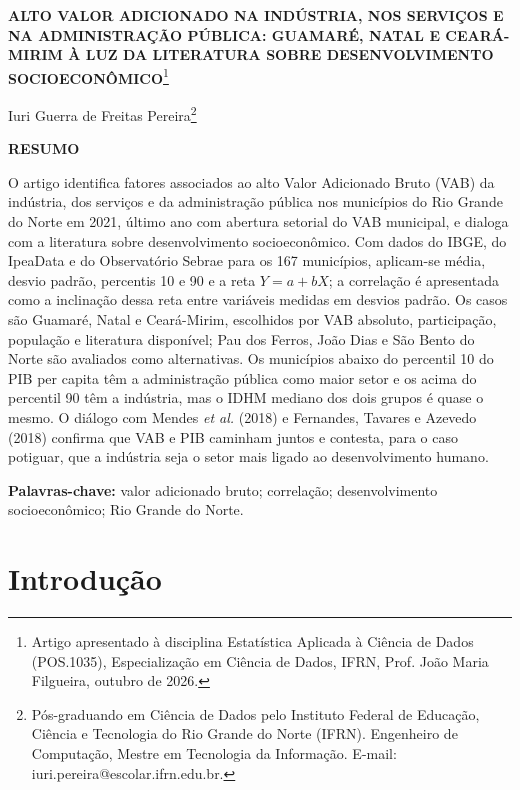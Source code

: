 \documentclass[12pt,a4paper]{article}
\begin{document}
\thispagestyle{empty}
\begin{singlespace}
\begin{center}
\textbf{ALTO VALOR ADICIONADO NA INDÚSTRIA, NOS SERVIÇOS E NA ADMINISTRAÇÃO PÚBLICA: GUAMARÉ, NATAL E CEARÁ-MIRIM À LUZ DA LITERATURA SOBRE DESENVOLVIMENTO SOCIOECONÔMICO}\footnote{Artigo apresentado à disciplina Estatística Aplicada à Ciência de Dados (POS.1035), Especialização em Ciência de Dados, IFRN, Prof. João Maria Filgueira, outubro de 2026.}
\end{center}
\vspace{8pt}
\begin{flushright}
Iuri Guerra de Freitas Pereira\footnote{Pós-graduando em Ciência de Dados pelo Instituto Federal de Educação, Ciência e Tecnologia do Rio Grande do Norte (IFRN). Engenheiro de Computação, Mestre em Tecnologia da Informação. E-mail: iuri.pereira@escolar.ifrn.edu.br.}
\end{flushright}
\vspace{8pt}
\noindent\textbf{RESUMO}

\noindent O artigo identifica fatores associados ao alto Valor Adicionado Bruto (VAB) da indústria, dos serviços e da administração pública nos municípios do Rio Grande do Norte em 2021, último ano com abertura setorial do VAB municipal, e dialoga com a literatura sobre desenvolvimento socioeconômico. Com dados do IBGE, do IpeaData e do Observatório Sebrae para os 167 municípios, aplicam-se média, desvio padrão, percentis 10 e 90 e a reta $Y = a + bX$; a correlação é apresentada como a inclinação dessa reta entre variáveis medidas em desvios padrão. Os casos são Guamaré, Natal e Ceará-Mirim, escolhidos por VAB absoluto, participação, população e literatura disponível; Pau dos Ferros, João Dias e São Bento do Norte são avaliados como alternativas. Os municípios abaixo do percentil 10 do PIB per capita têm a administração pública como maior setor e os acima do percentil 90 têm a indústria, mas o IDHM mediano dos dois grupos é quase o mesmo. O diálogo com Mendes \textit{et al.} (2018) e Fernandes, Tavares e Azevedo (2018) confirma que VAB e PIB caminham juntos e contesta, para o caso potiguar, que a indústria seja o setor mais ligado ao desenvolvimento humano.

\vspace{4pt}
\noindent\textbf{Palavras-chave:} valor adicionado bruto; correlação; desenvolvimento socioeconômico; Rio Grande do Norte.
\end{singlespace}

\section{Introdução}
\end{document}
